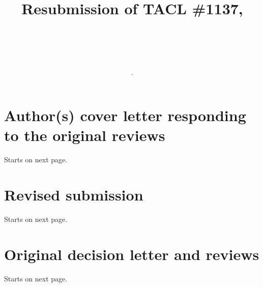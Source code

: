 \documentclass{article}[11pt,oneside]
\title{Resubmission of TACL \#1137, \\ \subtitle.   \\}
\newcommand{\resubmission}{tacl.pdf}  %
\newcommand{\origdecision}{original_letter.pdf}  %
\newcommand{\coverfile}{reviewer_response.pdf}  %
\begin{document}
\maketitle

\tableofcontents

\section{Author(s) cover letter responding to the original reviews} Starts on next page.

\section{Revised submission} Starts on next page.

\section{Original decision letter and reviews} Starts on next page.

\end{document}
